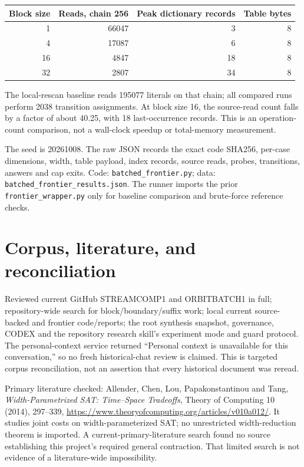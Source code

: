 \documentclass[11pt]{article}
\begin{document}
\begin{center}\begin{tabular}{rrrr}
\toprule
Block size & Reads, chain 256 & Peak dictionary records & Table bytes\\
\midrule
1 & 66047 & 3 & 8\\
4 & 17087 & 6 & 8\\
16 & 4847 & 18 & 8\\
32 & 2807 & 34 & 8\\
\bottomrule
\end{tabular}\end{center}
The local-rescan baseline reads 195077 literals on that chain; all compared runs perform 2038 transition assignments. At block size 16, the source-read count falls by a factor of about 40.25, with 18 last-occurrence records. This is an operation-count comparison, not a wall-clock speedup or total-memory measurement.

The seed is 20261008. The raw JSON records the exact code SHA256, per-case dimensions, width, table payload, index records, source reads, probes, transitions, answers and cap exits. Code: \texttt{batched\_frontier.py}; data: \texttt{batched\_frontier\_results.json}. The runner imports the prior \texttt{frontier\_wrapper.py} only for baseline comparison and brute-force reference checks.

\section{Corpus, literature, and reconciliation}
Reviewed current GitHub STREAMCOMP1 and ORBITBATCH1 in full; repository-wide search for block/boundary/suffix work; local current source-backed and frontier code/reports; the root synthesis snapshot, governance, CODEX and the repository research skill's experiment mode and guard protocol. The personal-context service returned ``Personal context is unavailable for this conversation,'' so no fresh historical-chat review is claimed. This is targeted corpus reconciliation, not an assertion that every historical document was reread.

Primary literature checked: Allender, Chen, Lou, Papakonstantinou and Tang, \emph{Width-Parametrized SAT: Time--Space Tradeoffs}, Theory of Computing 10 (2014), 297--339, \url{https://www.theoryofcomputing.org/articles/v010a012/}. It studies joint costs on width-parameterized SAT; no unrestricted width-reduction theorem is imported. A current-primary-literature search found no source establishing this project's required general contraction. That limited search is not evidence of a literature-wide impossibility.
\end{document}
